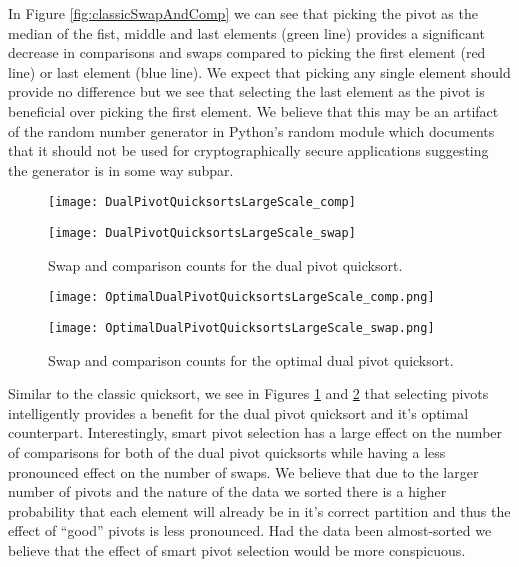 	In Figure \ref{fig:classicSwapAndComp} we can see that picking the pivot as the median of the fist, middle and last elements (green line) provides a significant decrease in comparisons and swaps compared to picking the first element (red line) or last element (blue line). We expect that picking any single element should provide no difference but we see that selecting the last element as the pivot is beneficial over picking the first element. We believe that this may be an artifact of the random number generator in Python's random module which documents that it should not be used for cryptographically secure applications suggesting the generator is in some way subpar. 

	\begin{figure}
		\centering
		\begin{minipage}{.5\textwidth}
		 	\centering
		 	\texttt{[image: DualPivotQuicksortsLargeScale\_comp]}
		\end{minipage}%
		\begin{minipage}{.5\textwidth}
		 	\centering
		 	\texttt{[image: DualPivotQuicksortsLargeScale\_swap]}
		\end{minipage}
		\caption{Swap and comparison counts for the dual pivot quicksort.}
		\label{fig:dualSwapAndComp}
	\end{figure}

	\begin{figure}
		\centering
		\begin{minipage}{.5\textwidth}
		 	\centering
		 	\texttt{[image: OptimalDualPivotQuicksortsLargeScale\_comp.png]}
		\end{minipage}%
		\begin{minipage}{.5\textwidth}
		 	\centering
		 	\texttt{[image: OptimalDualPivotQuicksortsLargeScale\_swap.png]}
		\end{minipage}
		\caption{Swap and comparison counts for the optimal dual pivot quicksort.}
		\label{fig:optimalDualSwapAndCount}
	\end{figure}

	Similar to the classic quicksort, we see in Figures \ref{fig:dualSwapAndComp} and \ref{fig:optimalDualSwapAndCount} that selecting pivots intelligently provides a benefit for the dual pivot quicksort and it's optimal counterpart. Interestingly, smart pivot selection has a large effect on the number of comparisons for both of the dual pivot quicksorts while having a less pronounced effect on the number of swaps. We believe that due to the larger number of pivots and the nature of the data we sorted there is a higher probability that each element will already be in it's correct partition and thus the effect of ``good'' pivots is less pronounced. Had the data been almost-sorted we believe that the effect of smart pivot selection would be more conspicuous.

